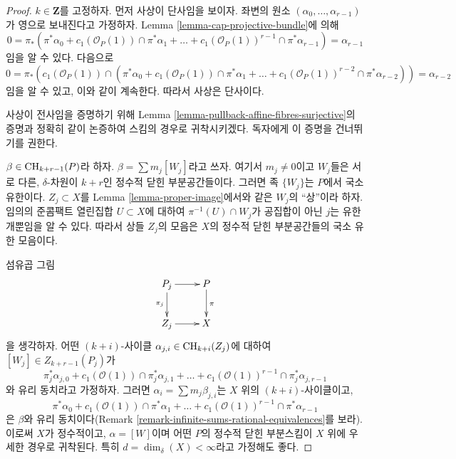 \begin{proof}
$k \in \mathbf{Z}$를 고정하자. 먼저 사상이 단사임을 보이자.
좌변의 원소 $(\alpha_0, \ldots, \alpha_{r - 1})$가 영으로
보내진다고 가정하자. Lemma \ref{lemma-cap-projective-bundle}에 의해
$$
0 = \pi_*(\pi^*\alpha_0 +
c_1(\mathcal{O}_P(1)) \cap \pi^*\alpha_1
+ \ldots +
c_1(\mathcal{O}_P(1))^{r - 1} \cap \pi^*\alpha_{r-1})
= \alpha_{r - 1}
$$
임을 알 수 있다. 다음으로
$$
0 = \pi_*(c_1(\mathcal{O}_P(1)) \cap (\pi^*\alpha_0 +
c_1(\mathcal{O}_P(1)) \cap \pi^*\alpha_1
+ \ldots +
c_1(\mathcal{O}_P(1))^{r - 2} \cap \pi^*\alpha_{r - 2}))
= \alpha_{r - 2}
$$
임을 알 수 있고, 이와 같이 계속한다. 따라서 사상은 단사이다.

\medskip\noindent
사상이 전사임을 증명하기 위해 Lemma
\ref{lemma-pullback-affine-fibres-surjective}의 증명과 정확히
같이 논증하여 스킴의 경우로 귀착시키겠다.
독자에게 이 증명을 건너뛰기를 권한다.

\medskip\noindent
$\beta \in \mathop{\mathrm{CH}}\nolimits_{k + r - 1}(P)$라 하자.
$\beta = \sum m_j[W_j]$라고 쓰자. 여기서 $m_j \not = 0$이고
$W_j$들은 서로 다른, $\delta$-차원이 $k + r$인 정수적
닫힌 부분공간들이다.
그러면 족 $\{W_j\}$는 $P$에서 국소 유한이다.
$Z_j \subset X$를 Lemma \ref{lemma-proper-image}에서와 같은
$W_j$의 “상”이라 하자. 임의의 준콤팩트 열린집합
$U \subset X$에 대하여 $\pi^{-1}(U) \cap W_j$가 공집합이 아닌
$j$는 유한 개뿐임을 알 수 있다. 따라서 상들 $Z_j$의 모음은
$X$의 정수적 닫힌 부분공간들의 국소 유한 모음이다.

\medskip\noindent
섬유곱 그림
$$
\xymatrix{
P_j \ar[r] \ar[d]_{\pi_j} & P \ar[d]^\pi \\
Z_j \ar[r] & X
}
$$
을 생각하자. 어떤 $(k + i)$-사이클
$\alpha_{j, i} \in \mathop{\mathrm{CH}}\nolimits_{k + i}(Z_j)$에 대하여
$[W_j] \in Z_{k + r - 1}(P_j)$가
$$
\pi_j^*\alpha_{j, 0} +
c_1(\mathcal{O}(1)) \cap \pi_j^*\alpha_{j, 1} +
\ldots +
c_1(\mathcal{O}(1))^{r - 1} \cap \pi_j^*\alpha_{j, r - 1}
$$
와 유리 동치라고 가정하자. 그러면
$\alpha_i = \sum m_j \beta_{j, i}$는 $X$ 위의
$(k + i)$-사이클이고,
$$
\pi^*\alpha_0 +
c_1(\mathcal{O}(1)) \cap \pi^*\alpha_1 +
\ldots +
c_1(\mathcal{O}(1))^{r - 1} \cap \pi^*\alpha_{r - 1}
$$
은 $\beta$와 유리 동치이다(Remark
\ref{remark-infinite-sums-rational-equivalences}를 보라).
이로써 $X$가 정수적이고, $\alpha = [W]$이며
어떤 $P$의 정수적 닫힌 부분스킴이 $X$ 위에 우세한 경우로 귀착된다.
특히 $d = \dim_\delta(X) < \infty$라고 가정해도 좋다.


\end{proof}
